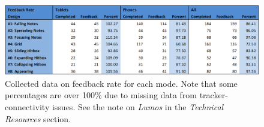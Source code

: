 \documentclass{sig-alternate}
\begin{document}
\begin{figure}[htb!]
	\begin{center}
		\includegraphics[width=1\linewidth]{figure_data_feedback}
	\end{center}
	\vspace{-12pt}
	\caption{Collected data on feedback rate for each mode. Note that some percentages are over 100\% due to missing data from tracker-connectivity issues. See the note on \textit{Lumos} in the \textit{Technical Resources} section.}
	\label{fig:data_feedback}
\end{figure}
\end{document}
